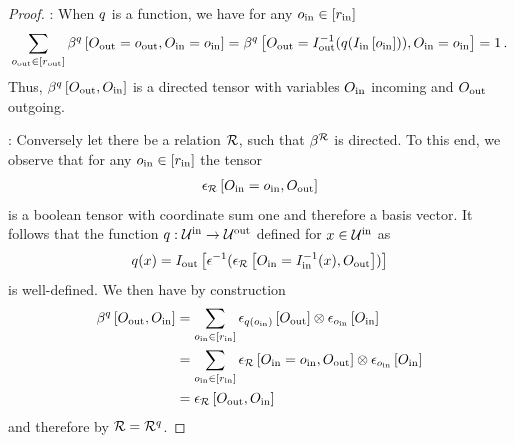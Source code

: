 \begin{proof}
    \proofrightsymbol{}:
    When $q$ is a function, we have for any $o_{\mathrm{in}}\in[r_{\mathrm{in}}]$
    \begin{align*}
        \sum_{\indindexofin{\outsymbol}} \bencodingofat{\exfunction}{\indexedindvariableof{\outsymbol},\indexedindvariableof{\insymbol}}
        =  \bencodingofat{\exfunction}{\indvariableof{\outsymbol}=\invindexinterpretationofat{\outsymbol}{\exfunctionat{\indexinterpretationofat{\insymbol}{\indindexof{\insymbol}}}},\indexedindvariableof{\insymbol}}
        = 1 \, .
    \end{align*}
    Thus, $\bencodingofat{\exfunction}{\indvariableof{\outsymbol},\indvariableof{\insymbol}}$ is a directed tensor with variables $O_{\mathrm{in}}$ incoming and $O_{\mathrm{out}}$ outgoing.

    \proofleftsymbol{}:
    Conversely let there be a relation $\mathcal{R}$, such that $\beta^{\mathcal{R}}$ is directed.
    To this end, we observe that for any $o_{\mathrm{in}}\in[r_{\mathrm{in}}]$ the tensor
    \begin{align*}
        \epsilon_{\mathcal{R}}\left[O_{\mathrm{in}}=o_{\mathrm{in}},O_{\mathrm{out}}\right]
    \end{align*}
    is a boolean tensor with coordinate sum one and therefore a basis vector.
    It follows that the function $q : \mathcal{U}^{\mathrm{in}} \rightarrow \mathcal{U}^{\mathrm{out}} $ defined for $x\in\mathcal{U}^{\mathrm{in}}$ as
    \begin{align*}
        q(x)
        = I_{\mathrm{out}}\left[\epsilon^{-1}(\epsilon_{\mathcal{R}}\left[O_{\mathrm{in}}=I_{\mathrm{in}}^{-1}(x),O_{\mathrm{out}}\right])\right]
    \end{align*}
    is well-defined.
    We then have by construction
    \begin{align*}
        \bencodingofat{\exfunction}{\indvariableof{\outsymbol},\indvariableof{\insymbol}}
        & = \sum_{\indindexofin{\insymbol}}
        \onehotmapofat{\exfunction(\indindexof{\insymbol})}{\indvariableof{\outsymbol}} \otimes
        \onehotmapofat{\indindexof{\insymbol}}{\indvariableof{\insymbol}} \\
        & =  \sum_{\indindexofin{\insymbol}} \onehotmapofat{\exrelation}{\indexedindvariableof{\insymbol},\indvariableof{\outsymbol}} \otimes
        \onehotmapofat{\indindexof{\insymbol}}{\indvariableof{\insymbol}} \\
        & = \onehotmapofat{\exrelation}{\indvariableof{\outsymbol},\indvariableof{\insymbol}}
    \end{align*}
    and therefore by  $\mathcal{R}=\mathcal{R}^{q}$.
\end{proof}

